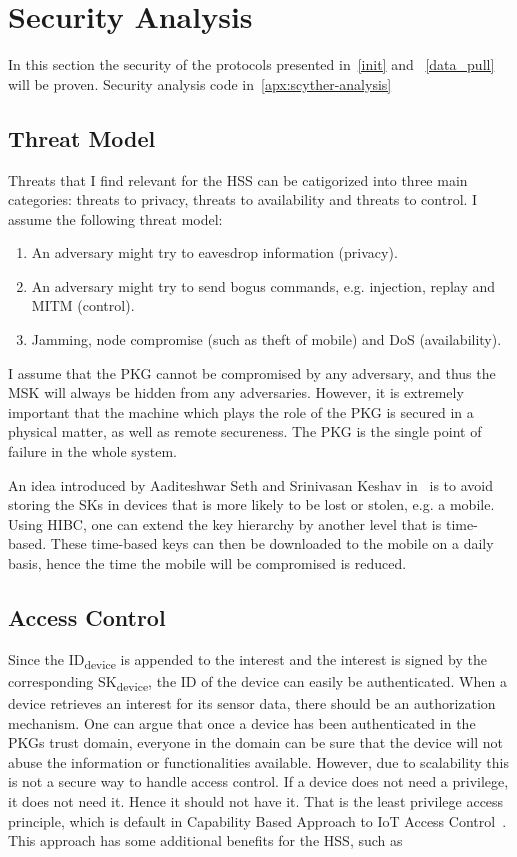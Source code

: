 \section{Security Analysis}
In this section the security of the protocols presented in~\autoref{init} and ~\autoref{data_pull} will be proven.
\todo{!!}
Security analysis code in~\autoref{apx:scyther-analysis}

\subsection{Threat Model}
Threats that I find relevant for the \gls{HSS} can be catigorized into three main categories: threats to privacy, threats to availability and threats to control.
I assume the following threat model:
\begin{enumerate}
  \item An adversary might try to eavesdrop information (privacy).
  \item An adversary might try to send bogus commands, e.g. injection, replay and \gls{MITM} (control).
  \item Jamming, node compromise (such as theft of mobile) and \gls{DoS} (availability).
\end{enumerate}

I assume that the \gls{PKG} cannot be compromised by any adversary, and thus the \gls{MSK} will always be hidden from any adversaries. 
However, it is extremely important that the machine which plays the role of the \gls{PKG} is secured in a physical matter, as well as remote secureness. 
The \gls{PKG} is the single point of failure in the whole system.

An idea introduced by Aaditeshwar Seth and Srinivasan Keshav in~\cite[Section 5.4]{Seth:2005:PSD:1897159.1897165} is to avoid storing the \gls{SK}s in devices that is more likely to be lost or stolen, e.g. a mobile.
Using \gls{HIBC}, one can extend the key hierarchy by another level that is time-based.
These time-based keys can then be downloaded to the mobile on a daily basis, hence the time the mobile will be compromised is reduced.

\subsection{Access Control}\label{access_control}
Since the ID\textsubscript{device} is appended to the \gls{interest} and the \gls{interest} is signed by the corresponding SK\textsubscript{device}, the \gls{ID} of the device can easily be authenticated. 
When a device retrieves an \gls{interest} for its sensor \gls{data}, there should be an authorization mechanism. 
One can argue that once a device has been authenticated in the \gls{PKG}s trust domain, everyone in the domain can be sure that the device will not abuse the information or functionalities available. 
However, due to scalability this is not a secure way to handle access control. 
If a device does not need a privilege, it does not need it.
Hence it should not have it. 
That is the least privilege access principle, which is default in Capability Based Approach to \gls{IoT} Access Control~\cite{DBLP:conf/imis/GusmeroliPR12}.
This approach has some additional benefits for the \gls{HSS}, such as

